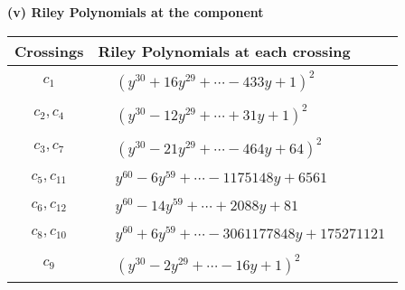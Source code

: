 \documentclass[1p]{elsarticle_modified}
\theoremstyle{definition}
\begin{document}
\flushleft \textbf{(v) Riley Polynomials at the component}\newline \\
\begin{tabular}{m{50pt}|m{274pt}}
Crossings & \hspace{64pt}Riley Polynomials at each crossing \\
\hline $$\begin{aligned}c_{1}\end{aligned}$$&$\begin{aligned}
&(y^{30}+16 y^{29}+\cdots-433 y+1)^{2}
\end{aligned}$\\
\hline $$\begin{aligned}c_{2},c_{4}\end{aligned}$$&$\begin{aligned}
&(y^{30}-12 y^{29}+\cdots+31 y+1)^{2}
\end{aligned}$\\
\hline $$\begin{aligned}c_{3},c_{7}\end{aligned}$$&$\begin{aligned}
&(y^{30}-21 y^{29}+\cdots-464 y+64)^{2}
\end{aligned}$\\
\hline $$\begin{aligned}c_{5},c_{11}\end{aligned}$$&$\begin{aligned}
&y^{60}-6 y^{59}+\cdots-1175148 y+6561
\end{aligned}$\\
\hline $$\begin{aligned}c_{6},c_{12}\end{aligned}$$&$\begin{aligned}
&y^{60}-14 y^{59}+\cdots+2088 y+81
\end{aligned}$\\
\hline $$\begin{aligned}c_{8},c_{10}\end{aligned}$$&$\begin{aligned}
&y^{60}+6 y^{59}+\cdots-3061177848 y+175271121
\end{aligned}$\\
\hline $$\begin{aligned}c_{9}\end{aligned}$$&$\begin{aligned}
&(y^{30}-2 y^{29}+\cdots-16 y+1)^{2}
\end{aligned}$\\
\hline
\end{tabular}\\~\\
\end{document}
